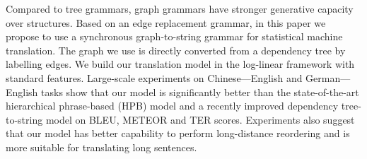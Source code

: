 Compared to tree grammars, graph grammars have stronger generative capacity over structures. Based on an edge replacement grammar, in this paper we propose to use a synchronous graph-to-string grammar for statistical machine translation. The graph we use is directly converted from a dependency tree by labelling edges. We build our translation model in the log-linear framework with standard features. Large-scale experiments on Chinese---English and German---English tasks show that our model is significantly better than the state-of-the-art hierarchical phrase-based (HPB) model and a recently improved dependency tree-to-string model on BLEU, METEOR and TER scores. Experiments also suggest that our model has better capability to perform long-distance reordering and is more suitable for translating long sentences.
